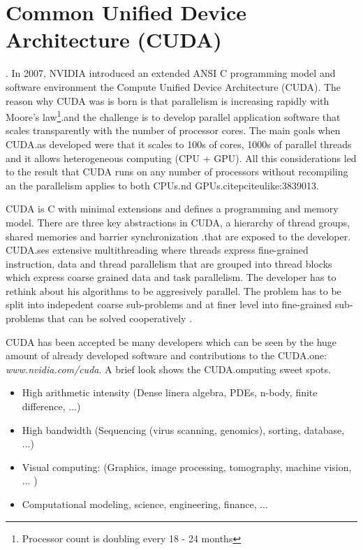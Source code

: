 \section{Common Unified Device Architecture (CUDA)}.%
\label{sub:common_unified_device_architecture_cuda_} 
In 2007, NVIDIA introduced an extended ANSI C programming model and software
environment the Compute Unified Device Architecture (CUDA). The reason why CUDA
was is born is that parallelism is increasing rapidly with Moore's
law\footnote{Processor count is doubling every 18 - 24 months}.and the challenge
is to develop parallel application software that scales transparently with the
number of processor cores. The main goals when \gls{CUDA}.as developed were that
it scales to 100s of cores, 1000s of parallel threads and it allows
heterogeneous computing (CPU + GPU). All this considerations led to the result
that \gls{CUDA} runs on any number of processors without recompiling an the
parallelism applies to both \glspl{CPU}.nd \glspl{GPU}.citep{citeulike:3839013}.

CUDA is C with minimal extensions and defines a programming and memory model.
There are three key abstractions in CUDA, a hierarchy of thread groups, shared
memories and barrier synchronization \citep{citeulike:3325943}.that are exposed
to the developer. \gls{CUDA}.ses extensive multithreading where threads express
fine-grained instruction, data and thread parallelism that are grouped into
thread blocks which express coarse grained data and task parallelism. The
developer has to rethink about his algorithms to be aggresively parallel.
The problem has to be split into indepedent coarse sub-problems and at finer
level into fine-grained sub-problems that can be solved cooperatively
\citep{citeulike:3325943}.

CUDA has been accepted be many developers which can be seen by the huge amount
of already developed software and contributions to the \gls{CUDA}.one:
\emph{www.nvidia.com/cuda}. A brief look shows the \gls{CUDA}.omputing sweet 
spots\citep{citeulike:3839013}. 
\begin{itemize}
	\item High arithmetic intensity (Dense linera algebra, PDEs, n-body, 
			finite difference, ...) 
	\item High bandwidth (Sequencing (virus scanning, genomics), sorting, 			
			database, ...) 
	\item Visual computing: (Graphics, image processing, tomography, 
			machine vision, ... ) 
	\item Computational modeling, science, engineering, finance, ... 			
\end{itemize} 

